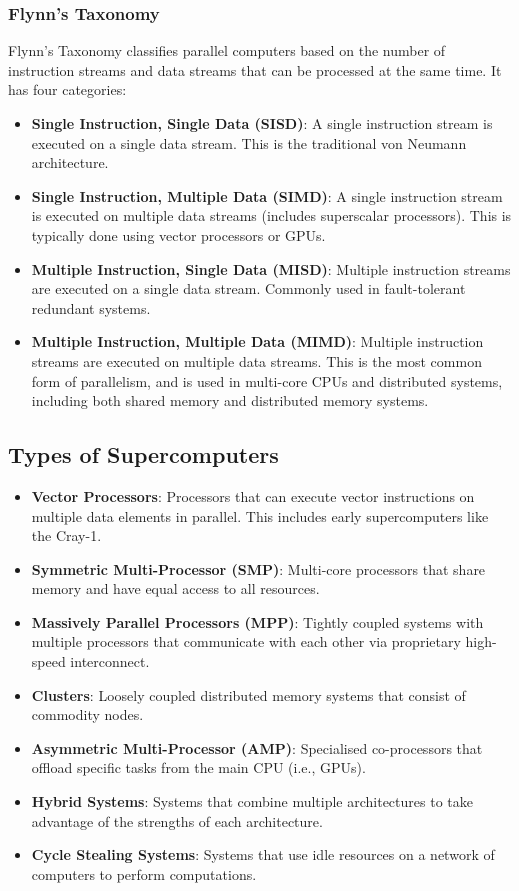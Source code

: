 \documentclass{article}
\begin{document}
\subsubsection{Flynn's Taxonomy}
Flynn's Taxonomy classifies parallel computers based on the number of
instruction streams and data streams that can be processed at the same
time. It has four categories:
\begin{itemize}
    \item \textbf{Single Instruction, Single Data (SISD)}: A single
          instruction stream is executed on a single data stream. This
          is the traditional von Neumann architecture.
    \item \textbf{Single Instruction, Multiple Data (SIMD)}: A single
          instruction stream is executed on multiple data streams
          (includes superscalar processors). This is typically done
          using vector processors or GPUs.
    \item \textbf{Multiple Instruction, Single Data (MISD)}: Multiple
          instruction streams are executed on a single data stream.
          Commonly used in fault-tolerant redundant systems.
    \item \textbf{Multiple Instruction, Multiple Data (MIMD)}: Multiple
          instruction streams are executed on multiple data streams.
          This is the most common form of parallelism, and is used in
          multi-core CPUs and distributed systems, including both
          shared memory and distributed memory systems.
\end{itemize}
\subsection{Types of Supercomputers}
\begin{itemize}
    \item \textbf{Vector Processors}: Processors that can execute
          vector instructions on multiple data elements in parallel.
          This includes early supercomputers like the Cray-1.
    \item \textbf{Symmetric Multi-Processor (SMP)}: Multi-core
          processors that share memory and have equal access to all
          resources.
    \item \textbf{Massively Parallel Processors (MPP)}: Tightly coupled
          systems with multiple processors that communicate with each
          other via proprietary high-speed interconnect.
    \item \textbf{Clusters}: Loosely coupled distributed memory systems
          that consist of commodity nodes.
    \item \textbf{Asymmetric Multi-Processor (AMP)}: Specialised
          co-processors that offload specific tasks from the main CPU (i.e., GPUs).
    \item \textbf{Hybrid Systems}: Systems that combine multiple
          architectures to take advantage of the strengths of each
          architecture.
    \item \textbf{Cycle Stealing Systems}: Systems that use idle
          resources on a network of computers to perform computations.
\end{itemize}
\end{document}
